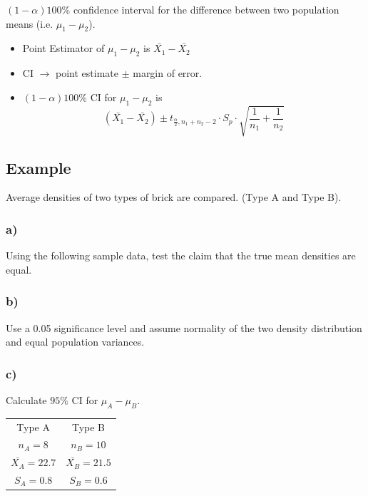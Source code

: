 \documentclass{article}
\begin{document}
        $(1-\alpha)100\%$ confidence interval for the difference between two population means (i.e. $\mu_{1} - \mu_{2}$).\par

        \begin{itemize}
            \item Point Estimator of $\mu_{1} - \mu_{2}$ is $\bar{X_{1}} - \bar{X_{2}}$
            \item CI $\rightarrow$ point estimate $\pm$ margin of error.
            \item $(1-\alpha)100\%$ CI for $\mu_{1} - \mu_{2}$ is 
                  \begin{equation*}
                    (\bar{X_{1}}- \bar{X_{2}}) \pm t_{\frac{\alpha}{2}, n_{1} + n_{2} - 2} \cdot S_{p} \cdot \sqrt{\frac{1}{n_{1}}+\frac{1}{n_{2}}}
                  \end{equation*}
        \end{itemize}

        \subsection*{Example}
        Average densities of two types of brick are compared. (Type A and Type B).
        \subsubsection*{a)}
        Using the following sample data, test the claim that the 
        true mean densities are equal.
        \subsubsection*{b)}
        Use a 0.05 significance level and assume normality of the two density distribution and equal population variances.
        \subsubsection*{c)}
        Calculate $95\%$ CI for $\mu_{A} - \mu_{B}$.

        \begin{center}
            \begin{tabular}{c c}
            Type A & Type B   \\
            $n_{A} = 8$ & $n_{B} = 10$ \\
            $\bar{X_{A}} = 22.7$ & $\bar{X_{B}} = 21.5$ \\
            $S_{A} = 0.8$ & $S_{B} = 0.6$
            \end{tabular}
        \end{center}
\end{document}
